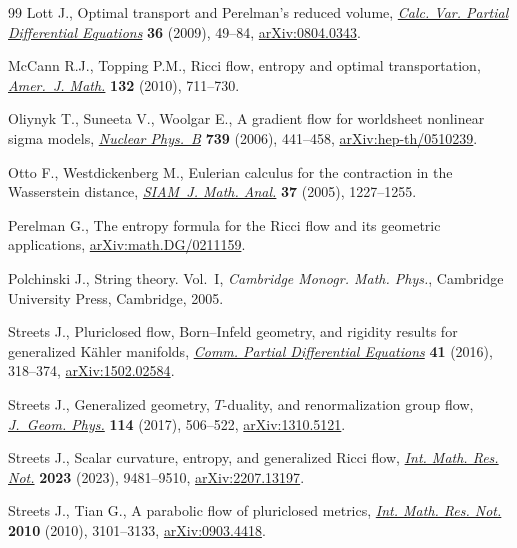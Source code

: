 \documentclass[11pt]{article}
\numberwithin{equation}{section}
\numberwithin{equation}{section}
\begin{document}
\begin{thebibliography}{99}
Lott J., Optimal transport and {P}erelman's reduced volume, \href{https://doi.org/10.1007/s00526-009-0223-8}{\textit{Calc. Var.
 Partial Differential Equations}} \textbf{36} (2009), 49--84,
 \href{https://arxiv.org/abs/0804.0343}{arXiv:0804.0343}.

McCann R.J., Topping P.M., Ricci flow, entropy and optimal transportation,
 \href{https://doi.org/10.1353/ajm.0.0110}{\textit{Amer.~J. Math.}} \textbf{132} (2010), 711--730.

Oliynyk T., Suneeta V., Woolgar E., A gradient flow for worldsheet nonlinear
 sigma models, \href{https://doi.org/10.1016/j.nuclphysb.2006.01.036}{\textit{Nuclear Phys.~B}} \textbf{739} (2006), 441--458,
 \href{https://arxiv.org/abs/hep-th/0510239}{arXiv:hep-th/0510239}.

Otto F., Westdickenberg M., Eulerian calculus for the contraction in the
 {W}asserstein distance, \href{https://doi.org/10.1137/050622420}{\textit{SIAM~J. Math. Anal.}} \textbf{37} (2005),
 1227--1255.

Perelman G., The entropy formula for the {R}icci flow and its geometric
 applications, \href{https://arxiv.org/abs/math.DG/0211159}{arXiv:math.DG/0211159}.

Polchinski J., String theory. {V}ol.~{I}, \textit{Cambridge Monogr. Math. Phys.},
 Cambridge University Press, Cambridge, 2005.

Streets J., Pluriclosed flow, {B}orn--{I}nfeld geometry, and rigidity results
 for generalized {K}\"ahler manifolds, \href{https://doi.org/10.1080/03605302.2015.1116560}{\textit{Comm. Partial Differential
 Equations}} \textbf{41} (2016), 318--374, \href{https://arxiv.org/abs/1502.02584}{arXiv:1502.02584}.

Streets J., Generalized geometry, {$T$}-duality, and renormalization group
 flow, \href{https://doi.org/10.1016/j.geomphys.2016.12.017}{\textit{J.~Geom. Phys.}} \textbf{114} (2017), 506--522,
 \href{https://arxiv.org/abs/1310.5121}{arXiv:1310.5121}.

Streets J., Scalar curvature, entropy, and generalized {R}icci flow,
 \href{https://doi.org/10.1093/imrn/rnad002}{\textit{Int. Math. Res. Not.}} \textbf{2023} (2023), 9481--9510,
 \href{https://arxiv.org/abs/2207.13197}{arXiv:2207.13197}.

Streets J., Tian G., A parabolic flow of pluriclosed metrics, \href{https://doi.org/10.1093/imrn/rnp237}{\textit{Int.
 Math. Res. Not.}} \textbf{2010} (2010), 3101--3133, \href{https://arxiv.org/abs/0903.4418}{arXiv:0903.4418}.


\end{thebibliography}
\end{document}
